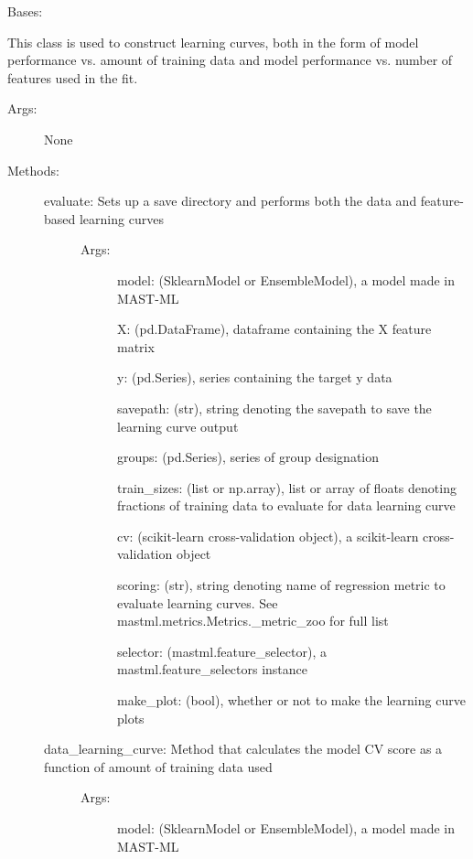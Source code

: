 \documentclass[letterpaper,10pt,english]{sphinxmanual}
\begin{document}
\begin{fulllineitems}
\label{\detokenize{api/mastml.learning_curve.LearningCurve:mastml.learning_curve.LearningCurve}}
Bases: 

This class is used to construct learning curves, both in the form of model performance vs. amount of training
data and model performance vs. number of features used in the fit.
\begin{description}
\item[{Args:}] \leavevmode
None

\item[{Methods:}] \leavevmode\begin{description}
\item[{evaluate: Sets up a save directory and performs both the data and feature-based learning curves}] \leavevmode\begin{description}
\item[{Args:}] \leavevmode
model: (SklearnModel or EnsembleModel), a model made in MAST-ML

X: (pd.DataFrame), dataframe containing the X feature matrix

y: (pd.Series), series containing the target y data

savepath: (str), string denoting the savepath to save the learning curve output

groups: (pd.Series), series of group designation

train\_sizes: (list or np.array), list or array of floats denoting fractions of training data to evaluate for data learning curve

cv: (scikit-learn cross-validation object), a scikit-learn cross-validation object

scoring: (str), string denoting name of regression metric to evaluate learning curves. See mastml.metrics.Metrics.\_metric\_zoo for full list

selector: (mastml.feature\_selector), a mastml.feature\_selectors instance

make\_plot: (bool), whether or not to make the learning curve plots

\end{description}

\item[{data\_learning\_curve: Method that calculates the model CV score as a function of amount of training data used}] \leavevmode\begin{description}
\item[{Args:}] \leavevmode
model: (SklearnModel or EnsembleModel), a model made in MAST-ML


\end{description}
\end{description}
\end{description}
\end{fulllineitems}
\end{document}
